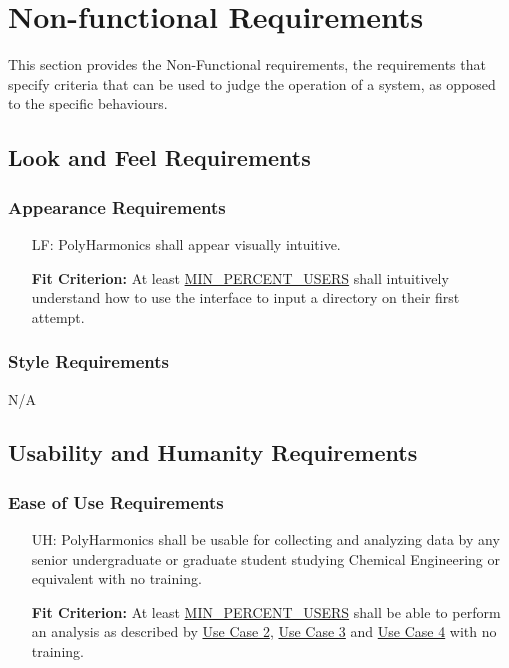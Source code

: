 \documentclass[12pt]{article}
\newcounter{lafnum}
\newcounter{uahnum}
\newcommand{\progname}{PolyHarmonics}
\begin{document}
\begin{itemize}

\end{itemize}

\section{Non-functional Requirements}

This section provides the Non-Functional requirements, the requirements that
specify criteria that can be used to judge the operation of a system, as opposed
to the specific behaviours.

\subsection{Look and Feel Requirements}

\subsubsection{Appearance Requirements}
\noindent \begin{itemize}
\item[LF\refstepcounter{lafnum}\thelafnum\label{NF_laf1}:] \progname{} shall
  appear visually intuitive.
						
  \textbf{Fit Criterion:} At least \hyperref[AppendA]{MIN\_PERCENT\_USERS}
  shall intuitively understand how to use the interface to input a directory on
  their first attempt.
\end{itemize}

\subsubsection{Style Requirements}

N/A

\subsection{Usability and Humanity Requirements}

\subsubsection{Ease of Use Requirements}

\noindent \begin{itemize}
\item[UH\refstepcounter{uahnum}\theuahnum\label{NF_uah1}:] \progname{} shall be
  usable for collecting and analyzing data by any senior
  undergraduate or graduate student studying Chemical Engineering or equivalent
  with no training.

  \textbf{Fit Criterion:} At least \hyperref[AppendA]{MIN\_PERCENT\_USERS}
  shall be able to perform an analysis as described by \hyperref[UseCase]{Use 
Case 
2}, \hyperref[UseCase]{Use Case 3} and \hyperref[UseCase]{Use Case 4}
 with no training.
\end{itemize}
\end{document}
